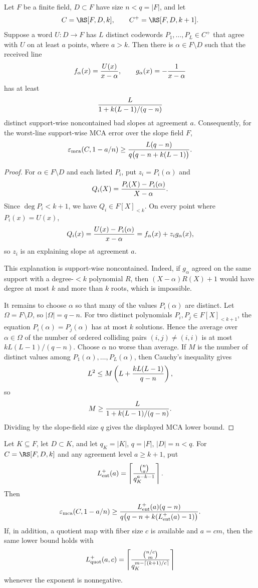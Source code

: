 \begin{theorem}
\label{thm:deep-point-list-to-mca}
Let \(F\) be a finite field, \(D\subset F\) have size \(n<q=|F|\), and let
\[
  C=\RS[F,D,k],
  \qquad
  C^+=\RS[F,D,k+1].
\]
Suppose a word \(U:D\to F\) has \(L\) distinct codewords
\(P_1,
\ldots,P_L\in C^+\) that agree with \(U\) on at least \(a\) points, where
\(a>k\).  Then there is \(\alpha\in F\setminus D\) such that the received line
\[
  f_\alpha(x)={U(x)\over x-\alpha},
  \qquad
  g_\alpha(x)=-{1\over x-\alpha}
\]
has at least
\[
  {L\over 1+k(L-1)/(q-n)}
\]
distinct support-wise noncontained bad slopes at agreement \(a\).  Consequently,
for the worst-line support-wise MCA error over the slope field \(F\),
\[
  \varepsilon_{\rm mca}(C,1-a/n)
  \geq
  {L(q-n)\over q\bigl(q-n+k(L-1)\bigr)}.
\]
\end{theorem}

\begin{proof}
For \(\alpha\in F\setminus D\) and each listed \(P_i\), put
\(z_i=P_i(\alpha)\) and
\[
  Q_i(X)={P_i(X)-P_i(\alpha)\over X-\alpha}.
\]
Since \(\deg P_i<k+1\), we have \(Q_i\in F[X]_{<k}\).  On every point where
\(P_i(x)=U(x)\),
\[
  Q_i(x)={U(x)-P_i(\alpha)\over x-\alpha}
        =f_\alpha(x)+z_i g_\alpha(x),
\]
so \(z_i\) is an explaining slope at agreement \(a\).

This explanation is support-wise noncontained.  Indeed, if
\(g_\alpha\) agreed on the same support with a degree-\(<k\) polynomial \(R\),
then \((X-\alpha)R(X)+1\) would have degree at most \(k\) and more than \(k\)
roots, which is impossible.

It remains to choose \(\alpha\) so that many of the values \(P_i(\alpha)\) are
distinct.  Let \(\Omega=F\setminus D\), so \(|\Omega|=q-n\).  For two distinct
polynomials \(P_i,P_j\in F[X]_{<k+1}\), the equation
\(P_i(\alpha)=P_j(\alpha)\) has at most \(k\) solutions.  Hence the average over
\(\alpha\in\Omega\) of the number of ordered colliding pairs \((i,j)\ne(i,i)\)
is at most \(kL(L-1)/(q-n)\).  Choose \(\alpha\) no worse than average.  If
\(M\) is the number of distinct values among \(P_1(\alpha),\ldots,P_L(\alpha)\),
then Cauchy's inequality gives
\[
  L^2\leq M\left(L+{kL(L-1)\over q-n}\right),
\]
so
\[
  M\geq {L\over 1+k(L-1)/(q-n)}.
\]
Dividing by the slope-field size \(q\) gives the displayed MCA lower bound.
\end{proof}

\begin{corollary}
\label{cor:generated-entropy-mca-floor}
Let \(K\subseteq F\), let \(D\subset K\), and let \(q_K=|K|\), \(q=|F|\),
\(|D|=n<q\).  For \(C=\RS[F,D,k]\) and any agreement level \(a\geq k+1\), put
\[
  L_{\rm ent}^+(a)
  =\left\lceil {\binom{n}{a}\over q_K^{a-k-1}}\right\rceil .
\]
Then
\[
  \varepsilon_{\rm mca}(C,1-a/n)
  \geq
  {L_{\rm ent}^+(a)(q-n)
   \over
   q\bigl(q-n+k(L_{\rm ent}^+(a)-1)\bigr)}.
\]
If, in addition, a quotient map with fiber size \(c\) is available and
\(a=cm\), then the same lower bound holds with
\[
  L_{\rm quot}^+(a,c)
  =\left\lceil
    {\binom{n/c}{m}
     \over
     q_K^{m-\lceil (k+1)/c\rceil}}
    \right\rceil
\]
whenever the exponent is nonnegative.
\end{corollary}


